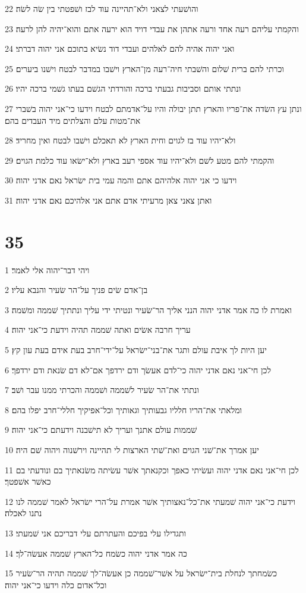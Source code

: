 \par 22 והושׁעתי לצאני ולא־תהיינה עוד לבז ושׁפטתי בין שׂה לשׂה׃
\par 23 והקמתי עליהם רעה אחד ורעה אתהן את עבדי דויד הוא ירעה אתם והוא־יהיה להן לרעה׃
\par 24 ואני יהוה אהיה להם לאלהים ועבדי דוד נשׂיא בתוכם אני יהוה דברתי׃
\par 25 וכרתי להם ברית שׁלום והשׁבתי חיה־רעה מן־הארץ וישׁבו במדבר לבטח וישׁנו ביערים׃
\par 26 ונתתי אותם וסביבות גבעתי ברכה והורדתי הגשׁם בעתו גשׁמי ברכה יהיו׃
\par 27 ונתן עץ השׂדה את־פריו והארץ תתן יבולה והיו על־אדמתם לבטח וידעו כי־אני יהוה בשׁברי את־מטות עלם והצלתים מיד העבדים בהם׃
\par 28 ולא־יהיו עוד בז לגוים וחית הארץ לא תאכלם וישׁבו לבטח ואין מחריד׃
\par 29 והקמתי להם מטע לשׁם ולא־יהיו עוד אספי רעב בארץ ולא־ישׂאו עוד כלמת הגוים׃
\par 30 וידעו כי אני יהוה אלהיהם אתם והמה עמי בית ישׂראל נאם אדני יהוה׃
\par 31 ואתן צאני צאן מרעיתי אדם אתם אני אלהיכם נאם אדני יהוה׃

\chapter{35}

\par 1 ויהי דבר־יהוה אלי לאמר׃
\par 2 בן־אדם שׂים פניך על־הר שׂעיר והנבא עליו׃
\par 3 ואמרת לו כה אמר אדני יהוה הנני אליך הר־שׂעיר ונטיתי ידי עליך ונתתיך שׁממה ומשׁמה׃
\par 4 עריך חרבה אשׂים ואתה שׁממה תהיה וידעת כי־אני יהוה׃
\par 5 יען היות לך איבת עולם ותגר את־בני־ישׂראל על־ידי־חרב בעת אידם בעת עון קץ׃
\par 6 לכן חי־אני נאם אדני יהוה כי־לדם אעשׂך ודם ירדפך אם־לא דם שׂנאת ודם ירדפך׃
\par 7 ונתתי את־הר שׂעיר לשׁממה ושׁממה והכרתי ממנו עבר ושׁב׃
\par 8 ומלאתי את־הריו חלליו גבעותיך וגאותיך וכל־אפיקיך חללי־חרב יפלו בהם׃
\par 9 שׁממות עולם אתנך ועריך לא תישׁבנה וידעתם כי־אני יהוה׃
\par 10 יען אמרך את־שׁני הגוים ואת־שׁתי הארצות לי תהיינה וירשׁנוה ויהוה שׁם היה׃
\par 11 לכן חי־אני נאם אדני יהוה ועשׂיתי כאפך וכקנאתך אשׁר עשׂיתה משׂנאתיך בם ונודעתי בם כאשׁר אשׁפטך׃
\par 12 וידעת כי־אני יהוה שׁמעתי את־כל־נאצותיך אשׁר אמרת על־הרי ישׂראל לאמר שׁממה לנו נתנו לאכלה׃
\par 13 ותגדילו עלי בפיכם והעתרתם עלי דבריכם אני שׁמעתי׃
\par 14 כה אמר אדני יהוה כשׂמח כל־הארץ שׁממה אעשׂה־לך׃
\par 15 כשׂמחתך לנחלת בית־ישׂראל על אשׁר־שׁממה כן אעשׂה־לך שׁממה תהיה הר־שׂעיר וכל־אדום כלה וידעו כי־אני יהוה׃

